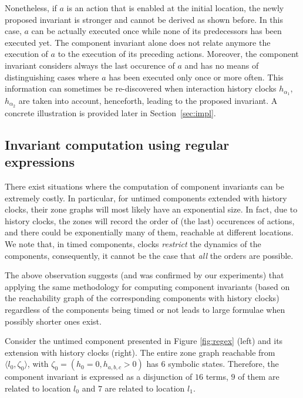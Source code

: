 \documentclass{LMCS}
\newcommand{\te}{h_0}
\theoremstyle{plain}\newtheorem{remark}[thm]{Remark}
\theoremstyle{plain}\newtheorem{example}[thm]{Example}
\begin{document}
Nonetheless, if $a$ is an action that is enabled at the initial
location, the newly proposed invariant is stronger and cannot be
derived as shown before.  In this case, $a$ can be actually executed
once while none of its predecessors has been executed yet.  The
component invariant alone does not relate anymore the execution of $a$
to the execution of its preceding actions.  Moreover, the component
invariant considers always the last occurence of $a$ and has no means
of distinguishing cases where $a$ has been executed only once or more
often.  This information can sometimes be re-discovered when
interaction history clocks $h_{\alpha_1}$, $h_{\alpha_2}$ are taken
into account, henceforth, leading to the proposed invariant. A
concrete illustration is provided later in Section~\ref{sec:impl}.



\subsection{Invariant computation using regular expressions}
\label{sec:regex}

There exist situations where the computation of component invariants
can be extremely costly. In particular, for untimed components
extended with history clocks, their zone graphs will most likely have
an exponential size.  In fact, due to history clocks, the zones will
record the order of (the last) occurences of actions, and there could
be exponentially many of them, reachable at different locations. We
note that, in timed components, clocks \emph{restrict} the dynamics of
the components, consequently, it cannot be the case that \emph{all} the
orders are possible.



The above observation suggests (and was confirmed by our experiments)
that applying the same methodology for computing component invariants
(based on the reachability graph of the corresponding components with
history clocks) regardless of the components being timed or not leads
to large formulae when possibly shorter ones exist.

\begin{exa}\label{ex:regex-1} Consider the untimed component
  presented in Figure \ref{fig:regex}
  (left) and its extension with history clocks (right).  The entire
  zone graph reachable from $\langle l_0, \zeta_0\rangle$, with
  $\zeta_0 = (\te=0, h_{a,b,c}>0)$ has $6$ symbolic states.
  Therefore, the component invariant is expressed as a disjunction of
  $16$ terms, $9$ of them are related to location $l_0$ and $7$ are related 
to location $l_1$.
\end{exa}
\end{document}

